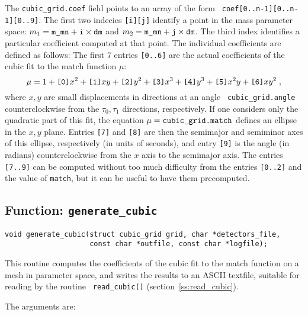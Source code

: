 The {\tt cubic\_grid.coef} field points to an array of the form {\tt
coef[0..n-1][0..n-1][0..9]}.  The first two indecies {\tt [i][j]}
identify a point in the mass parameter space: $m_1=\hbox{\tt
m\_mn}+\hbox{\tt i}\times\hbox{\tt dm}$ and $m_2=\hbox{\tt
m\_mn}+\hbox{\tt j}\times\hbox{\tt dm}$.  The third index identifies a
particular coefficient computed at that point.  The individual
coefficients are defined as follows: The first 7 entries {\tt [0..6]}
are the actual coefficients of the cubic fit to the match function
$\mu$:
\begin{equation}
\label{e:cubicmatch}
	\mu = 1 + {\hbox{\tt [0]}}x^2 + {\hbox{\tt [1]}}xy
		+ {\hbox{\tt [2]}}y^2 + {\hbox{\tt [3]}}x^3
		+ {\hbox{\tt [4]}}y^3 +	{\hbox{\tt [5]}}x^2y
		+ {\hbox{\tt [6]}}xy^2 \; ,
\end{equation}
where $x,y$ are small displacements in directions at an angle {\tt
cubic\_grid.angle} counterclockwise from the $\tau_0,\tau_1$
directions, respectively.  If one considers only the quadratic part of
this fit, the equation $\mu=\hbox{\tt cubic\_grid.match}$ defines an
ellipse in the $x,y$ plane.  Entries {\tt [7]} and {\tt [8]} are then
the semimajor and semiminor axes of this ellipse, respectively (in
units of seconds), and entry {\tt [9]} is the angle (in radians)
counterclockwise from the $x$ axis to the semimajor axis.  The entries
{\tt [7..9]} can be computed without too much difficulty from the
entries {\tt [0..2]} and the value of {\tt match}, but it can be
useful to have them precomputed.


\clearpage
\subsection{Function: {\tt generate\_cubic}}
\label{ss:generate_cubic}

\begin{verbatim}
void generate_cubic(struct cubic_grid grid, char *detectors_file,
                    const char *outfile, const char *logfile);
\end{verbatim}
This routine computes the coefficients of the cubic fit to the match
function on a mesh in parameter space, and writes the results to an
ASCII textfile, suitable for reading by the routine {\tt
read\_cubic()} (section~\ref{ss:read_cubic}).

The arguments are:

